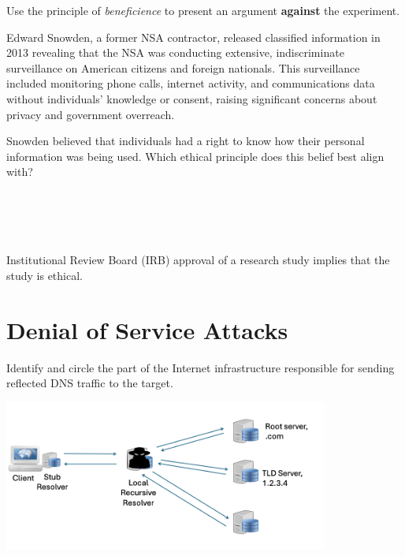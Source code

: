 \pagebreak
{} Use the principle of {\em beneficience} to present an
argument {\bf against}
the experiment.\\
\eprob


Edward Snowden, a former NSA contractor, released classified information in
2013 revealing that the NSA was conducting extensive, indiscriminate
surveillance on American citizens and foreign nationals. This surveillance
included monitoring phone calls, internet activity, and communications data
without individuals' knowledge or consent, raising significant concerns about
privacy and government overreach.

Snowden believed that individuals had a right to know how their personal
information was being used. Which ethical principle does this belief best
align with?\\
 \\
\\
\\
\\
\eprob

Institutional Review Board (IRB) approval of a research study implies that the
study is ethical.\\
\yesnono
\eprob

\section*{Denial of Service Attacks}

Identify and circle the part of the
Internet infrastructure responsible for sending reflected DNS traffic to the
target. \\ \vspace*{-0.1in}
\begin{center}
\includegraphics[width=0.8\textwidth]{dns2.png}  
\end{center}
\eprob


